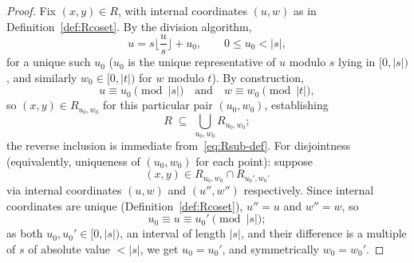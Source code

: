 \documentclass[a4paper,11pt,oneside,reqno]{amsart}
\theoremstyle{definition}
\theoremstyle{remark}
\theoremstyle{plain}
\begin{document}
\begin{proof}
  Fix \((x,y)\in R\), with internal coordinates \((u,w)\) as in Definition~\ref{def:Rcoset}. By the
  division algorithm,
  \[
    u=s\Big\lfloor\frac us\Big\rfloor+u_0, \qquad 0\le u_0<|s|,
  \]
  for a unique such \(u_0\) (\(u_0\) is the unique representative of \(u\) modulo \(s\) lying in
  \([0,|s|)\), and similarly \(w_0\in[0,|t|)\) for \(w\) modulo \(t\)). By construction,
  \[
    u\equiv u_0\!\!\pmod{|s|} \quad\text{and}\quad w\equiv w_0\!\!\pmod{|t|},
  \]
  so \((x,y)\in R_{u_0,w_0}\) for this particular pair
  \((u_0,w_0)\), establishing
  \[
    R\;\subseteq\;\bigcup_{u_0,w_0}R_{u_0,w_0};
  \]
  the reverse inclusion is immediate from~\eqref{eq:Rsub-def}. For disjointness (equivalently,
  uniqueness of \((u_0,w_0)\) for each point): suppose
  \[
    (x,y)\in R_{u_0,w_0}\cap R_{u_0',w_0'}
  \]
  via internal coordinates \((u,w)\) and \((u'',w'')\) respectively. Since internal coordinates are unique
  (Definition~\ref{def:Rcoset}), \(u''=u\) and \(w''=w\), so
  \[
    u_0\equiv u\equiv u_0'\!\!\pmod{|s|};
  \]
  as both
  \(u_0,u_0'\in[0,|s|)\), an interval of length \(|s|\), and their difference is a multiple of \(s\) of
  absolute value \(<|s|\), we get \(u_0=u_0'\), and symmetrically \(w_0=w_0'\).
\end{proof}
\end{document}
